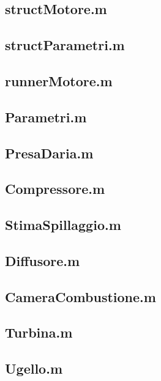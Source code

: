 \subsection{structMotore.m}

\subsection{structParametri.m}

\subsection{runnerMotore.m}

\subsection{Parametri.m}

\subsection{PresaDaria.m}

\subsection{Compressore.m}

\subsection{StimaSpillaggio.m}

\subsection{Diffusore.m}

\subsection{CameraCombustione.m}

\subsection{Turbina.m}

\subsection{Ugello.m}

